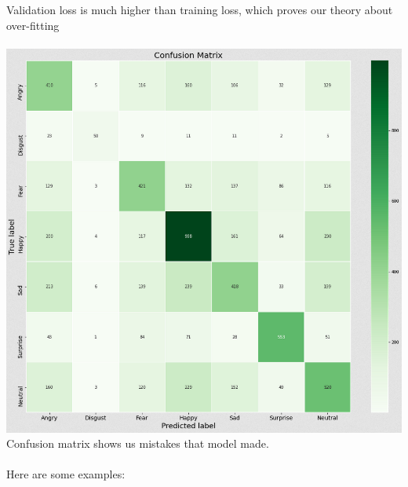 Validation loss is much higher than training loss, which proves our theory about over-fitting\\
\\
\includegraphics[scale=0.60]{images/modelOne/matrixOne.png}\\
Confusion matrix shows us mistakes that model made.\\
\\
Here are some examples:
